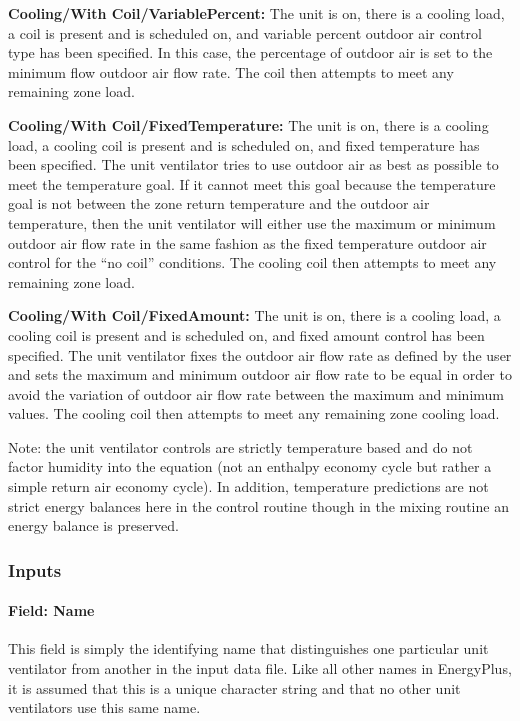 \textbf{Cooling/With Coil/VariablePercent:} The unit is on, there is a cooling load, a coil is present and is scheduled on, and variable percent outdoor air control type has been specified. In this case, the percentage of outdoor air is set to the minimum flow outdoor air flow rate. The coil then attempts to meet any remaining zone load.

\textbf{Cooling/With Coil/FixedTemperature:} The unit is on, there is a cooling load, a cooling coil is present and is scheduled on, and fixed temperature has been specified. The unit ventilator tries to use outdoor air as best as possible to meet the temperature goal. If it cannot meet this goal because the temperature goal is not between the zone return temperature and the outdoor air temperature, then the unit ventilator will either use the maximum or minimum outdoor air flow rate in the same fashion as the fixed temperature outdoor air control for the ``no coil'' conditions. The cooling coil then attempts to meet any remaining zone load.

\textbf{Cooling/With Coil/FixedAmount:} The unit is on, there is a cooling load, a cooling coil is present and is scheduled on, and fixed amount control has been specified. The unit ventilator fixes the outdoor air flow rate as defined by the user and sets the maximum and minimum outdoor air flow rate to be equal in order to avoid the variation of outdoor air flow rate between the maximum and minimum values. The cooling coil then attempts to meet any remaining zone cooling load.

Note: the unit ventilator controls are strictly temperature based and do not factor humidity into the equation (not an enthalpy economy cycle but rather a simple return air economy cycle). In addition, temperature predictions are not strict energy balances here in the control routine though in the mixing routine an energy balance is preserved.

\subsubsection{Inputs}\label{inputs-2-049}

\paragraph{Field: Name}\label{field-name-2-045}

This field is simply the identifying name that distinguishes one particular unit ventilator from another in the input data file. Like all other names in EnergyPlus, it is assumed that this is a unique character string and that no other unit ventilators use this same name.

